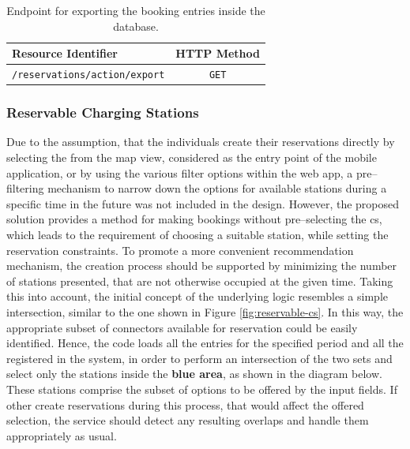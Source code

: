 \begingroup
\setlength{\tabcolsep}{10pt} %
\renewcommand{\arraystretch}{1.5} %
\begin{table}[h]
\centering
\caption{Endpoint for exporting the booking entries inside the database.}
    \begin{tabular}{l|c}
    Resource Identifier & HTTP Method \\ \hline
    \texttt{/reservations/action/export} & \texttt{GET}
    \end{tabular}
\label{tab:export-reservation-rest}
\end{table}
\endgroup

\subsubsection{Reservable Charging Stations}
\label{ch:Implementation:sec:Reservation System:ssec:Additional Capabilities:sssec:Reservable Charging Stations}

Due to the assumption, that the individuals create their reservations directly by selecting the  from the map view, considered as the entry point of the mobile application, or by using the various filter options within the web app, a pre--filtering mechanism to narrow down the options for available stations during a specific time in the future was not included in the design.
However, the proposed solution provides a method for making bookings without pre--selecting the \acrshort{cs}, which leads to the requirement of choosing a suitable station, while setting the reservation constraints. To promote a more convenient recommendation mechanism, the creation process should be supported by minimizing the number of stations presented, that are not otherwise occupied at the given time.
Taking this into account, the initial concept of the underlying logic resembles a simple intersection, similar to the one shown in Figure \ref{fig:reservable-cs}. In this way, the appropriate subset of connectors available for reservation could be easily identified.
Hence, the code loads all the entries for the specified period and all the  registered in the system, in order to perform an intersection of the two sets and select only the stations inside the \textbf{blue area}, as shown in the diagram below. These stations comprise the subset of options to be offered by the input fields.
If other  create reservations during this process, that would affect the offered selection, the service should detect any resulting overlaps and handle them appropriately as usual.

